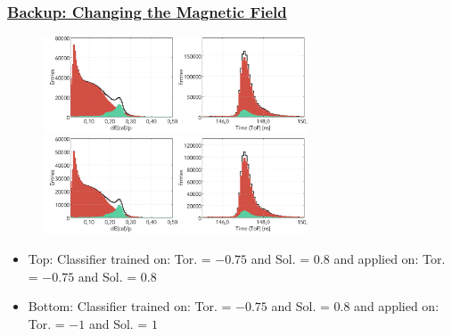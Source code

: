 \documentclass[xcolor=table, xcolor=dvipsnames]{beamer}
\begin{document}
\begin{frame}
  \frametitle{\hyperlink{bup}{Backup: Changing the Magnetic Field}}
  \label{bmField}
  \footnotesize
  
  \begin{figure}
    \includegraphics[width=0.7\textwidth]{pidCALTMLP_T-075S08.png}\\
     \includegraphics[width=0.7\textwidth]{pidCALTMLP_T-075S08_appT-1S1.png}
  \end{figure}
  
  \begin{itemize}
    \item Top: Classifier trained on: Tor. = $-0.75$ and Sol. = $0.8$ and applied on: Tor. = $-0.75$ and Sol. = $0.8$
    \item Bottom: Classifier trained on: Tor. = $-0.75$ and Sol. = $0.8$ and applied on: Tor. = $-1$ and Sol. = $1$
  \end{itemize}
  
\end{frame}


    
  







 
\end{document}
